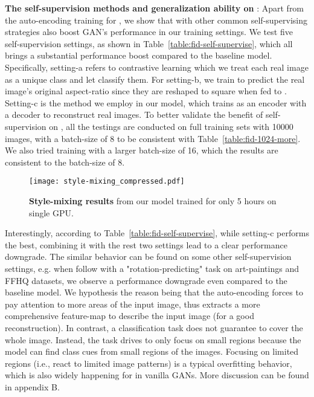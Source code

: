 \documentclass{article} \usepackage{iclr2021_conference,times}
\begin{document}
\textbf{The self-supervision methods and generalization ability  on }: Apart from the auto-encoding training for , we show that  with other common self-supervising strategies also boost GAN's performance in our training settings. We test five self-supervision settings, as shown in Table~\ref{table:fid-self-supervise}, which all brings a substantial performance boost compared to the baseline model. Specifically, setting-a refers to contrastive learning which we treat each real image as a unique class and let  classify them. For setting-b, we train  to predict the real image's original aspect-ratio since they are reshaped to square when fed to . Setting-c is the method we employ in our model, which trains  as an encoder with a decoder to reconstruct real images. To better validate the benefit of self-supervision on , all the testings are conducted on full training sets with 10000 images, with a batch-size of 8 to be consistent with Table~\ref{table:fid-1024-more}. We also tried training with a larger batch-size of 16, which the results are consistent to the batch-size of 8.

\begin{figure}
\centering
\texttt{[image: style-mixing\_compressed.pdf]}
\caption{\textbf{Style-mixing results} from our model trained for only 5 hours on single GPU. }
\label{fig:style-mixing}
\end{figure}

Interestingly, according to Table~\ref{table:fid-self-supervise}, while setting-c performs the best, combining it with the rest two settings lead to a clear performance downgrade. The similar behavior can be found on some other self-supervision settings, e.g. when follow \cite{chen2019self} with a "rotation-predicting" task on art-paintings and FFHQ datasets, we observe a performance downgrade even compared to the baseline model. We hypothesis the reason being that the auto-encoding forces  to pay attention to more areas of the input image, thus extracts a more comprehensive feature-map to describe the input image (for a good reconstruction). In contrast, a classification task does not guarantee  to cover the whole image. Instead, the task drives  to only focus on small regions because the model can find class cues from small regions of the images. Focusing on limited regions (i.e., react to limited image patterns) is a typical overfitting behavior, which is also widely happening for  in vanilla GANs. More discussion can be found in appendix B.
\end{document}
